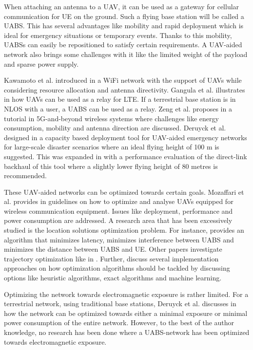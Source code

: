 When attaching an antenna to a \gls{UAV}, it can be used as a gateway for cellular communication for \gls{UE} on the ground.
Such a flying base station will be called a \gls{UABS}. 
This has several advantages like mobility and rapid deployment which is ideal for emergency situations or temporary events. Thanks to this mobility,  
\gls{UABS}s can easily be repositioned to satisfy certain requirements. A \gls{UAV}-aided network also brings some challenges with it like 
the limited weight of the payload and sparse power supply.

Kawamoto et al. introduced in \cite{U11} a WiFi network with the support of  \gls{UAV}s while considering resource allocation 
and antenna directivity. 
Gangula et al. illustrates in \cite{U10} how \gls{UAV}s can be  used as a relay for \gls{LTE}. 
If a terrestrial base station is in \gls{NLOS} with a user, a
\gls{UABS} can be used as a relay.
Zeng et al. proposes in  \cite{U12} a tutorial in 5G-and-beyond wireless systems where challenges like 
energy consumption, mobility and antenna direction are discussed. 
Deruyck et al. designed in \cite{J2} a capacity based deployment tool for UAV-aided emergency
networks for large-scale disaster scenarios where an ideal flying height of 100 m is suggested. This was expanded 
in \cite{U1} with a performance evaluation of the direct-link backhaul of this tool where a slightly lower 
flying height of 80 metres is recommended.

These \gls{UAV}-aided networks can be optimized towards certain goals.
Mozaffari et al. provides in \cite{U3} guidelines on how to optimize and analyse \gls{UAV}s equipped for 
wireless communication equipment. Issues like deployment, performance and power consumption are addressed.
A research area that has been excessively studied is the location solutions optimization problem.
For instance, \cite{U4} provides an algorithm that minimizes latency, \cite{U7,U9}  minimizes interference between \gls{UABS} and \cite{U8} minimizes the 
distance between \gls{UABS} and \gls{UE}. Other papers investigate trajectory optimization like in \cite{U7,U6}.
Further, \cite{U3,U5} discuss several implementation approaches on how optimization algorithms should be tackled by discussing options like 
heuristic algorithms, \gls{exact algorithm}s and machine learning. 

Optimizing the network towards electromagnetic exposure is rather limited. For a terrestrial network, using traditional base stations,
Deruyck et al. discusses in \cite{J1} how the network can be optimized towards either a minimal exposure or minimal power consumption of the entire network.
However, to the best of the author knowledge, no research has been done where a \gls{UABS}-network has been optimized towards electromagnetic exposure.

